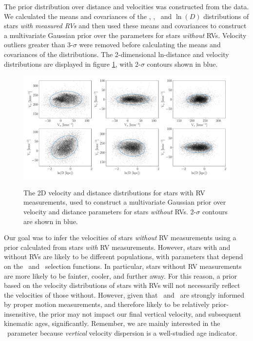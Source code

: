 The prior distribution over distance and velocities was constructed from the
data.
We calculated the means and covariances of the \vx, \vy, \vz\ and $\ln(D)$
distributions of stars {\it with measured RVs} and then used these means and
covariances to construct a multivariate Gaussian prior over the parameters for
stars {\it without} RVs.
Velocity outliers greater than 3-$\sigma$ were removed before calculating the
means and covariances of the distributions.
The 2-dimensional ln-distance and velocity distributions are displayed in
figure \ref{fig:prior_distributions_2D}, with 2-$\sigma$ contours shown in
blue.
\begin{figure}[ht!]
\caption{
The 2D velocity and distance distributions for stars with RV measurements,
    used to construct a multivariate Gaussian prior over velocity and
    distance parameters for stars {\it without} RVs.
2-$\sigma$ contours are shown in blue.
}
  \centering
    \includegraphics[width=1\textwidth]{prior_distributions_2D}
\label{fig:prior_distributions_2D}
\end{figure}

Our goal was to infer the velocities of stars {\it without} RV measurements
using a prior calculated from stars {\it with} RV measurements.
However, stars with and without RVs are likely to be different populations,
with parameters that depend on the \gaia\ and \lamost\ selection functions.
In particular, stars without RV measurements are more likely to be fainter,
cooler, and further away.
For this reason, a prior based on the velocity distributions of stars with RVs
will not necessarily reflect the velocities of those without.
However, given that \vx\ and \vz\ are strongly informed by proper motion
measurements, and therefore likely to be relatively prior-insensitive, the
prior may not impact our final vertical velocity, and subsequent kinematic
ages, significantly.
Remember, we are mainly interested in the \vz\ parameter because {\it
vertical} velocity dispersion is a well-studied age indicator.

